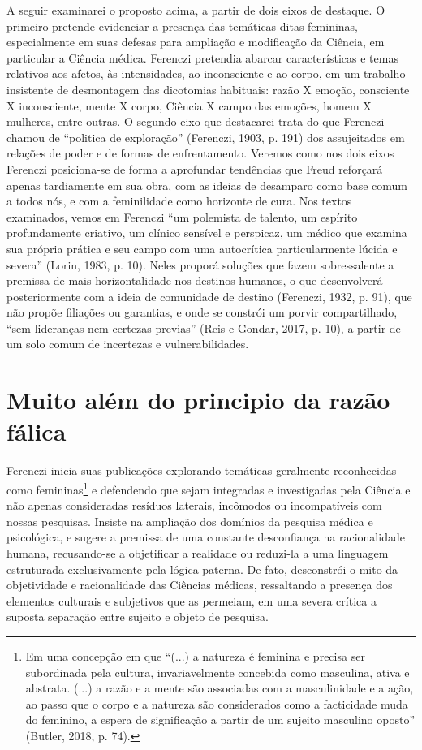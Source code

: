A seguir examinarei o proposto acima, a partir de dois eixos de
destaque. O primeiro pretende evidenciar a presença das temáticas ditas
femininas, especialmente em suas defesas para ampliação e modificação da
Ciência, em particular a Ciência médica. Ferenczi pretendia abarcar
características e temas relativos aos afetos, às intensidades, ao
inconsciente e ao corpo, em um trabalho insistente de desmontagem das
dicotomias habituais: razão X emoção, consciente X inconsciente, mente X
corpo, Ciência X campo das emoções, homem X mulheres, entre outras. O
segundo eixo que destacarei trata do que Ferenczi chamou de ``politica
de exploração'' (Ferenczi, 1903, p. 191) dos assujeitados em relações de
poder e de formas de enfrentamento. Veremos como nos dois eixos Ferenczi
posiciona-se de forma a aprofundar tendências que Freud reforçará apenas
tardiamente em sua obra, com as ideias de desamparo como base comum a
todos nós, e com a feminilidade como horizonte de cura. Nos textos
examinados, vemos em Ferenczi ``um polemista de talento, um espírito
profundamente criativo, um clínico sensível e perspicaz, um médico que
examina sua própria prática e seu campo com uma autocrítica
particularmente lúcida e severa'' (Lorin, 1983, p. 10). Neles proporá
soluções que fazem sobressalente a premissa de mais horizontalidade nos
destinos humanos, o que desenvolverá posteriormente com a ideia de
comunidade de destino (Ferenczi, 1932, p. 91), que não propõe filiações
ou garantias, e onde se constrói um porvir compartilhado, ``sem
lideranças nem certezas previas'' (Reis e Gondar, 2017, p. 10), a partir
de um solo comum de incertezas e vulnerabilidades.

\section{Muito além do principio da razão fálica }

Ferenczi inicia suas publicações explorando temáticas geralmente
reconhecidas como femininas\footnote{Em uma concepção em que ``(...) a
  natureza é feminina e precisa ser subordinada pela cultura,
  invariavelmente concebida como masculina, ativa e abstrata. (...) a
  razão e a mente são associadas com a masculinidade e a ação, ao passo
  que o corpo e a natureza são considerados como a facticidade muda do
  feminino, a espera de significação a partir de um sujeito masculino
  oposto'' (Butler, 2018, p. 74).} e defendendo que sejam integradas e
investigadas pela Ciência e não apenas consideradas resíduos laterais,
incômodos ou incompatíveis com nossas pesquisas. Insiste na ampliação
dos domínios da pesquisa médica e psicológica, e sugere a premissa de
uma constante desconfiança na racionalidade humana, recusando-se a
objetificar a realidade ou reduzi-la a uma linguagem estruturada
exclusivamente pela lógica paterna. De fato, desconstrói o mito da
objetividade e racionalidade das Ciências médicas, ressaltando a
presença dos elementos culturais e subjetivos que as permeiam, em uma
severa crítica a suposta separação entre sujeito e objeto de pesquisa.

